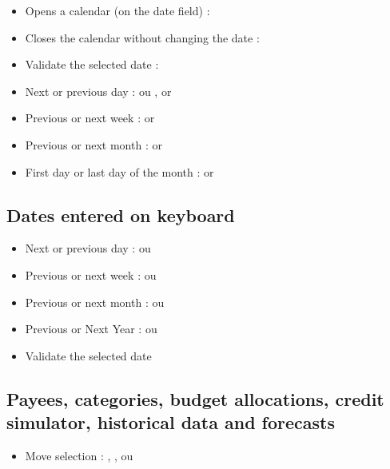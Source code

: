 \begin{itemize}
	\item Opens a calendar (on the date field) : 
	\item Closes the calendar without changing the date : 
	\item Validate the selected date : 
	\item Next or previous day : \key{+} ou \key{-},  or 
	\item Previous or next week :  or 
	\item Previous or next month :  or 
	\item First day or last day of the month :  or 
\end{itemize}


\subsection{Dates entered on keyboard }

\begin{itemize}
	\item Next or previous day : \key{+} ou \key{-}
	\item Previous or next week :  \key{+} ou  \key{-}
	\item Previous or next month :  ou 
	\item Previous or Next Year :   ou  
	\item Validate the selected date 
\end{itemize}


\subsection{Payees, categories, budget allocations, credit simulator, historical data and forecasts}

\begin{itemize}
	\item Move selection : , ,  ou 
\end{itemize}


